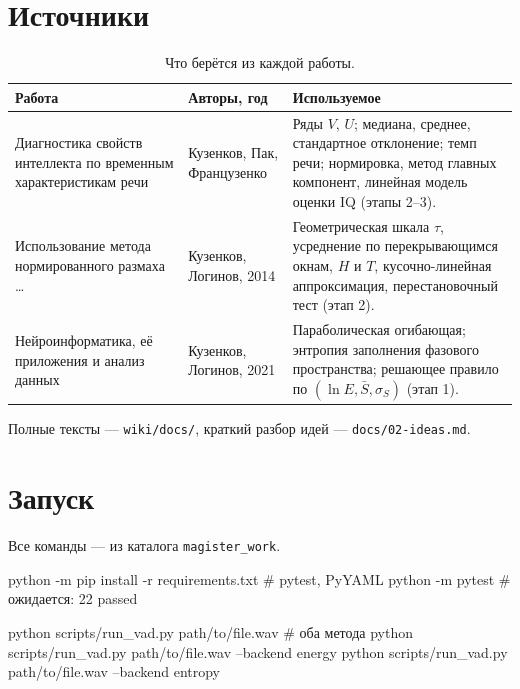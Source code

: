 \documentclass[11pt,a4paper]{article}
\theoremstyle{definition}
\theoremstyle{plain}
\newcommand{\code}[1]{\texttt{#1}}
\begin{document}
\section{Источники}

\begin{table}[h]\centering\small
\caption{Что берётся из каждой работы.}\label{tab:sources}
\begin{tabular}{@{}p{4.0cm}p{3.0cm}p{6.6cm}@{}}
\toprule
Работа & Авторы, год & Используемое \\
\midrule
Диагностика свойств интеллекта по временным характеристикам речи &
Кузенков, Пак, Французенко &
Ряды $V$, $U$; медиана, среднее, стандартное отклонение; темп речи;
нормировка, метод главных компонент, линейная модель оценки IQ (этапы 2--3). \\[2pt]
Использование метода нормированного размаха \dots &
Кузенков, Логинов, 2014 &
Геометрическая шкала $\tau$, усреднение по перекрывающимся окнам, $H$ и $T$,
кусочно-линейная аппроксимация, перестановочный тест (этап 2). \\[2pt]
Нейроинформатика, её приложения и анализ данных &
Кузенков, Логинов, 2021 &
Параболическая огибающая; энтропия заполнения фазового пространства;
решающее правило по $(\ln E,\bar S,\sigma_S)$ (этап 1). \\
\bottomrule
\end{tabular}
\end{table}

Полные тексты --- \code{wiki/docs/}, краткий разбор идей ---
\code{docs/02-ideas.md}.

\appendix
\section{Запуск}

Все команды --- из каталога \code{magister\_work}.

\begin{ShellCode}
python -m pip install -r requirements.txt   # pytest, PyYAML
python -m pytest                            # ожидается: 22 passed

python scripts/run_vad.py path/to/file.wav                  # оба метода
python scripts/run_vad.py path/to/file.wav --backend energy
python scripts/run_vad.py path/to/file.wav --backend entropy
\end{ShellCode}
\end{document}
